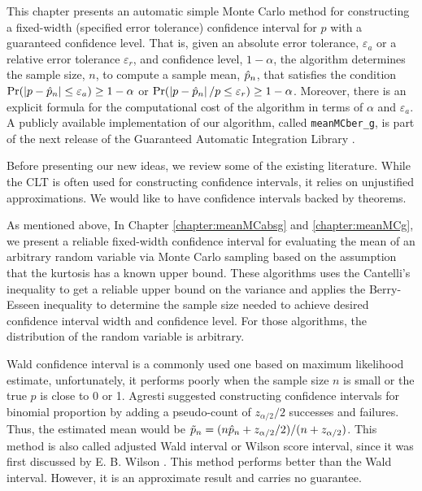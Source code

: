 \documentclass{iitthesis}
\begin{document}
This chapter presents an automatic simple Monte Carlo method for constructing a fixed-width (specified error tolerance) confidence interval for $p$ with a guaranteed confidence level. That is, given an absolute error tolerance, $\varepsilon_a$ or a relative error tolerance $\varepsilon_r$, and confidence level, $1-\alpha$, the algorithm determines the sample size, $n$, to compute a sample mean, $\hat{p}_n$, that satisfies the condition $\Pr(\left \lvert p-\hat{p}_n \right \rvert\leq \varepsilon_a) \geq 1-\alpha$ or $\Pr(\left \lvert p-\hat{p}_n \right \rvert/p\leq \varepsilon_r) \geq 1-\alpha$.  Moreover, there is an explicit formula for the computational cost of the algorithm in terms of $\alpha$ and $\varepsilon_a$. A publicly available implementation of our algorithm, called {\tt meanMCber\_g}, is part of the next release of the Guaranteed Automatic Integration Library \cite{GAIL_1_3}.

Before presenting our new ideas, we review some of the existing literature.  While the CLT is often used for constructing confidence intervals, it relies on unjustified approximations.  We would like to have confidence intervals backed by theorems.

As mentioned above, In Chapter \ref{chapter:meanMCabsg} and \ref{chapter:meanMCg}, we present a reliable fixed-width confidence interval for evaluating the mean of an arbitrary random variable via Monte Carlo sampling based on the assumption that the kurtosis has a known upper bound. These algorithms uses the Cantelli's inequality to get a reliable upper bound on the variance and applies the Berry-Esseen inequality to determine the sample size needed to achieve desired confidence interval width and confidence level. For those algorithms, the distribution of the random variable is arbitrary. 

Wald confidence interval \cite[Section 1.3.3]{Agresti02} is a commonly used one based on maximum likelihood estimate, unfortunately, it performs poorly when the sample size $n$ is small or the true $p$ is close to 0 or 1. Agresti \cite[Section 1.4.2]{Agresti02} suggested constructing confidence intervals for binomial proportion by adding a pseudo-count of $z_{\alpha/2}/2$ successes and failures. Thus, the estimated mean would be $\tilde{p}_n =(n\hat{p}_n+z_{\alpha/2}/2) / (n+z_{\alpha/2})$. This method is also called adjusted Wald interval or Wilson score interval, since it was first discussed by E. B. Wilson \cite{wilson27}. This method performs better than the Wald interval. However, it is an approximate result and carries no guarantee.
\end{document}
